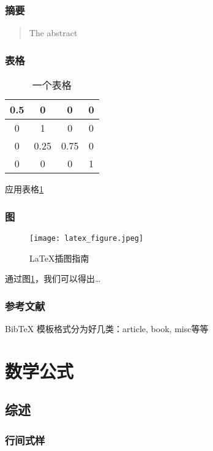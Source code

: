 \documentclass[a4paper,12pt]{article}
\begin{document}
\subsubsection{摘要}

\begin{abstract}
The abstract
\end{abstract}

\subsubsection{表格}

\begin{table}[!htp] %
\centering
\caption{一个表格}
\label{tab:1}
\begin{tabular}{|c|c|c|c|}
\hline
0.5&0&0&0\\
\hline
0&1&0&0\\
\hline
0&0.25&0.75&0\\
\hline
0&0&0&1\\
\hline
\end{tabular}  
\end{table}
应用表格\ref{tab:1}

\subsubsection{图}

\begin{figure}[!htb] %
\centering
\texttt{[image: latex\_figure.jpeg]}
\caption{\LaTeX{}插图指南}
\label{fig:1}
\end{figure}
通过图\ref{fig:1}，我们可以得出\ldots

\subsubsection{参考文献}

BibTeX 模板格式分为好几类：article\cite{1:article}, book\cite{2:book}, misc\cite{3:misc}等等 

\section{数学公式}

\subsection{综述}

\subsubsection{行间式样}
\end{document}
